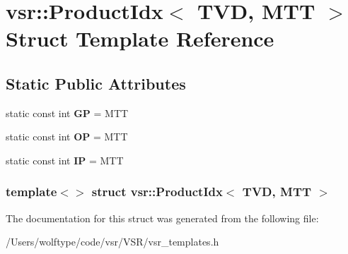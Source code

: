 \hypertarget{structvsr_1_1_product_idx_3_01_t_v_d_00_01_m_t_t_01_4}{\section{vsr\-:\-:Product\-Idx$<$ T\-V\-D, M\-T\-T $>$ Struct Template Reference}
\label{structvsr_1_1_product_idx_3_01_t_v_d_00_01_m_t_t_01_4}
}
\subsection*{Static Public Attributes}
\begin{DoxyCompactItemize}
\item 
\hypertarget{structvsr_1_1_product_idx_3_01_t_v_d_00_01_m_t_t_01_4_a9dcfffbfa11d921cb6065fa61a79205e}{static const int {\bfseries G\-P} = M\-T\-T}\label{structvsr_1_1_product_idx_3_01_t_v_d_00_01_m_t_t_01_4_a9dcfffbfa11d921cb6065fa61a79205e}

\item 
\hypertarget{structvsr_1_1_product_idx_3_01_t_v_d_00_01_m_t_t_01_4_a7532e0cd896faeb89d0d053a765fd49a}{static const int {\bfseries O\-P} = M\-T\-T}\label{structvsr_1_1_product_idx_3_01_t_v_d_00_01_m_t_t_01_4_a7532e0cd896faeb89d0d053a765fd49a}

\item 
\hypertarget{structvsr_1_1_product_idx_3_01_t_v_d_00_01_m_t_t_01_4_a045cc2c053675e8d74e097d9b55e82c8}{static const int {\bfseries I\-P} = M\-T\-T}\label{structvsr_1_1_product_idx_3_01_t_v_d_00_01_m_t_t_01_4_a045cc2c053675e8d74e097d9b55e82c8}

\end{DoxyCompactItemize}
\subsubsection*{template$<$$>$ struct vsr\-::\-Product\-Idx$<$ T\-V\-D, M\-T\-T $>$}



The documentation for this struct was generated from the following file\-:\begin{DoxyCompactItemize}
\item 
/\-Users/wolftype/code/vsr/\-V\-S\-R/vsr\-\_\-templates.\-h\end{DoxyCompactItemize}
